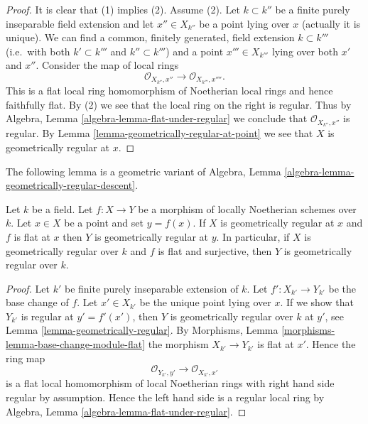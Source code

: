 \begin{proof}
It is clear that (1) implies (2). Assume (2).
Let $k \subset k''$ be a finite purely inseparable field extension
and let $x'' \in X_{k''}$ be a point lying over $x$ (actually it is
unique). We can find a common, finitely generated, field extension
$k \subset k'''$ (i.e.\ with both $k' \subset k'''$ and $k'' \subset k'''$)
and a point $x''' \in X_{k'''}$ lying over both $x'$ and $x''$.
Consider the map of local rings
$$
\mathcal{O}_{X_{k''}, x''} \longrightarrow \mathcal{O}_{X_{k'''}, x''''}.
$$
This is a flat local ring homomorphism of Noetherian local rings
and hence faithfully flat.
By (2) we see that the local ring on the right is regular.
Thus by Algebra, Lemma \ref{algebra-lemma-flat-under-regular}
we conclude that $\mathcal{O}_{X_{k''}, x''}$ is regular.
By Lemma \ref{lemma-geometrically-regular-at-point} we see that $X$
is geometrically regular at $x$.
\end{proof}

\noindent
The following lemma is a geometric variant of
Algebra, Lemma \ref{algebra-lemma-geometrically-regular-descent}.

\begin{lemma}
\label{lemma-flat-under-geometrically-regular}
Let $k$ be a field.
Let $f : X \to Y$ be a morphism of locally Noetherian schemes over $k$.
Let $x \in X$ be a point and set $y = f(x)$.
If $X$ is geometrically regular at $x$ and
$f$ is flat at $x$ then $Y$ is geometrically regular at $y$.
In particular, if $X$ is geometrically regular over $k$ and
$f$ is flat and surjective, then $Y$ is geometrically regular over $k$.
\end{lemma}

\begin{proof}
Let $k'$ be finite purely inseparable extension of $k$.
Let $f' : X_{k'} \to Y_{k'}$ be the base change of $f$.
Let $x' \in X_{k'}$ be the unique point lying over $x$.
If we show that $Y_{k'}$ is regular at $y' = f'(x')$, then
$Y$ is geometrically regular over $k$ at $y'$, see
Lemma \ref{lemma-geometrically-regular}.
By
Morphisms, Lemma \ref{morphisms-lemma-base-change-module-flat}
the morphism $X_{k'} \to Y_{k'}$ is flat at $x'$.
Hence the ring map
$$
\mathcal{O}_{Y_{k'}, y'}
\longrightarrow
\mathcal{O}_{X_{k'}, x'}
$$
is a flat local homomorphism of local Noetherian rings with
right hand side regular by assumption. Hence the left hand side
is a regular local ring by
Algebra, Lemma \ref{algebra-lemma-flat-under-regular}.
\end{proof}

